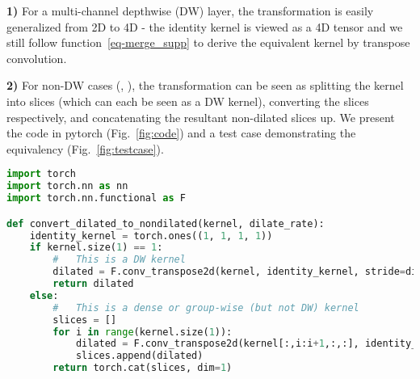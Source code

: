 \documentclass[10pt,twocolumn,letterpaper]{article}
\begin{document}
\textbf{1)} For a multi-channel depthwise (DW) layer, the transformation is easily generalized from 2D to 4D - the identity kernel  is viewed as a 4D tensor  and we still follow function~\ref{eq-merge_supp} to derive the equivalent kernel by transpose convolution.

\textbf{2)} For non-DW cases (\ie, ), the transformation can be seen as splitting the kernel into slices (which can each be seen as a DW kernel), converting the slices respectively, and concatenating the resultant non-dilated slices up. We present the code in pytorch (Fig.~\ref{fig:code}) and a test case demonstrating the equivalency (Fig.~\ref{fig:testcase}).



\begin{figure*}
    \begin{lstlisting}[language=Python]
import torch
import torch.nn as nn
import torch.nn.functional as F

def convert_dilated_to_nondilated(kernel, dilate_rate):
    identity_kernel = torch.ones((1, 1, 1, 1))
    if kernel.size(1) == 1:
        #   This is a DW kernel
        dilated = F.conv_transpose2d(kernel, identity_kernel, stride=dilate_rate)
        return dilated
    else:
        #   This is a dense or group-wise (but not DW) kernel
        slices = []
        for i in range(kernel.size(1)):
            dilated = F.conv_transpose2d(kernel[:,i:i+1,:,:], identity_kernel, stride=dilate_rate)
            slices.append(dilated)
        return torch.cat(slices, dim=1)
    \end{lstlisting}
    \caption{Pytorch code to convert a dilated conv layer's small kernel to a non-dilated layer's larger sparse kernel.}
    \label{fig:code}
\end{figure*}
\end{document}
